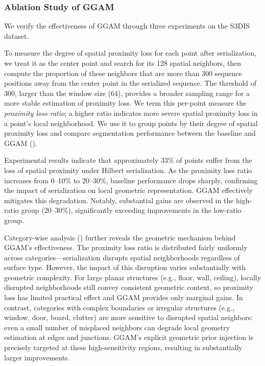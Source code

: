 \documentclass[a4paper,fleqn]{cas-sc}
\begin{document}
\subsubsection{Ablation Study of GGAM}

We verify the effectiveness of GGAM through three experiments on the S3DIS dataset.

To measure the degree of spatial proximity loss for each point after serialization, we treat it as the center point and search for its 128 spatial neighbors, then compute the proportion of these neighbors that are more than 300 sequence positions away from the center point in the serialized sequence. The threshold of 300, larger than the window size (64), provides a broader sampling range for a more stable estimation of proximity loss. We term this per-point measure the \textit{proximity loss ratio}; a higher ratio indicates more severe spatial proximity loss in a point's local neighborhood. We use it to group points by their degree of spatial proximity loss and compare segmentation performance between the baseline and GGAM ().

Experimental results indicate that approximately 33\% of points suffer from the loss of spatial proximity under Hilbert serialization. As the proximity loss ratio increases from 0--10\% to 20--30\%, baseline performance drops sharply, confirming the impact of serialization on local geometric representation. GGAM effectively mitigates this degradation. Notably, substantial gains are observed in the high-ratio group (20--30\%), significantly exceeding improvements in the low-ratio group.



Category-wise analysis () further reveals the geometric mechanism behind GGAM's effectiveness. The proximity loss ratio is distributed fairly uniformly across categories—serialization disrupts spatial neighborhoods regardless of surface type. However, the impact of this disruption varies substantially with geometric complexity. For large planar structures (e.g., floor, wall, ceiling), locally disrupted neighborhoods still convey consistent geometric context, so proximity loss has limited practical effect and GGAM provides only marginal gains. In contrast, categories with complex boundaries or irregular structures (e.g., window, door, board, clutter) are more sensitive to disrupted spatial neighbors: even a small number of misplaced neighbors can degrade local geometry estimation at edges and junctions. GGAM's explicit geometric prior injection is precisely targeted at these high-sensitivity regions, resulting in substantially larger improvements.
\end{document}
